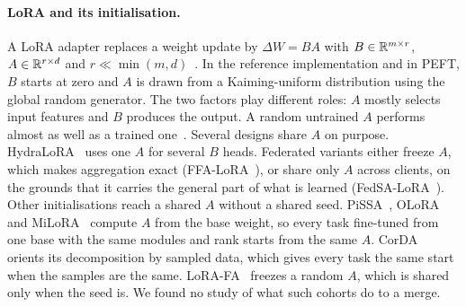 \paragraph{LoRA and its initialisation.} A LoRA adapter replaces a weight
update by $\Delta W = BA$ with $B \in \mathbb{R}^{m\times r}$, $A \in \mathbb{R}^{r\times d}$
and $r \ll \min(m, d)$~\citep{hu2022lora}. In the reference implementation and
in PEFT, $B$ starts at zero and $A$ is drawn from a Kaiming-uniform
distribution using the global random generator. The two factors play
different roles: $A$ mostly selects input features and $B$ produces the
output. A random untrained $A$ performs almost as well as a trained
one~\citep{zhu2024asymmetry}. Several designs share $A$ on purpose.
HydraLoRA~\citep{tian2024hydralora} uses one $A$ for several $B$ heads.
Federated variants either freeze $A$, which makes aggregation exact
(FFA-LoRA~\citep{sun2024ffalora}), or share only $A$ across clients, on the
grounds that it carries the general part of what is learned
(FedSA-LoRA~\citep{guo2025fedsalora}). Other initialisations reach a shared
$A$ without a shared seed. PiSSA~\citep{meng2024pissa},
OLoRA~\citep{buyukakyuz2024olora} and MiLoRA~\citep{wang2025milora} compute
$A$ from the base weight, so every task fine-tuned from one base with the same
modules and rank starts from the same $A$. CorDA~\citep{yang2024corda} orients
its decomposition by sampled data, which gives every task the same start when
the samples are the same. LoRA-FA~\citep{zhang2023lorafa} freezes a random
$A$, which is shared only when the seed is. We found no study of what such
cohorts do to a merge.

